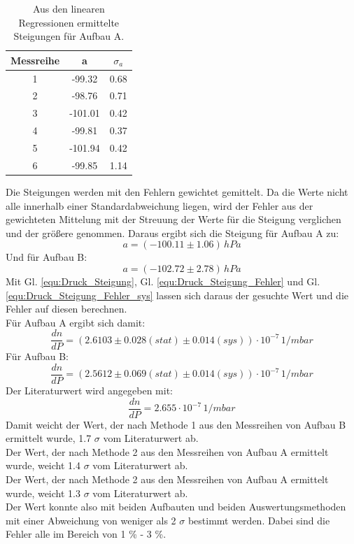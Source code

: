 \documentclass[12pt,a4paper]{article}
\begin{document}
\begin{table}
\begin{center}
\begin{tabular}{|c|c|c|}
\hline 
Messreihe & a & $\sigma _a$ \\ 
\hline 
1 & -99.32 & 0.68 \\ 
\hline 
2 & -98.76 & 0.71 \\ 
\hline 
3 & -101.01 & 0.42 \\ 
\hline 
4 & -99.81 & 0.37 \\ 
\hline 
5 & -101.94 & 0.42 \\ 
\hline 
6 & -99.85 & 1.14 \\  
\hline 
\end{tabular} 
\caption{Aus den linearen Regressionen ermittelte Steigungen für Aufbau A.}
\label{tab:Druck_Steigungen_A}
\end{center}
\end{table}

Die Steigungen werden mit den Fehlern gewichtet gemittelt. Da die Werte nicht alle innerhalb einer Standardabweichung liegen, wird der Fehler aus der gewichteten Mittelung mit der Streuung der Werte für die Steigung verglichen und der größere genommen. Daraus ergibt sich die Steigung für Aufbau A zu:
\begin{equation*}
a = (-100.11 \pm 1.06) \, \si{hPa}
\end{equation*}
Und für Aufbau B:
\begin{equation*}
a = (-102.72 \pm 2.78) \, \si{hPa}
\end{equation*}
Mit Gl. \ref{equ:Druck_Steigung}, Gl. \ref{equ:Druck_Steigung_Fehler} und Gl. \ref{equ:Druck_Steigung_Fehler_sys} lassen sich daraus der gesuchte Wert und die Fehler auf diesen berechnen. \\
Für Aufbau A ergibt sich damit:
\begin{equation*}
\dfrac{dn}{dP} = (2.6103 \pm 0.028 (stat) \pm 0.014 (sys)) \cdot 10^{-7} \, \si{1/mbar}  
\end{equation*}
Für Aufbau B:
\begin{equation*}
\dfrac{dn}{dP} = (2.5612 \pm 0.069 (stat) \pm 0.014 (sys)) \cdot 10^{-7} \, \si{1/mbar}
\end{equation*}
Der Literaturwert wird angegeben mit:
\begin{equation*}
\dfrac{dn}{dP} = 2.655 \cdot 10^{-7} \, \si{1/mbar}
\end{equation*}
Damit weicht der Wert, der nach Methode 1 aus den Messreihen von Aufbau B ermittelt wurde, 1.7 $\sigma$ vom Literaturwert ab.\\
Der Wert, der nach Methode 2 aus den Messreihen von Aufbau A ermittelt wurde, weicht 1.4 $\sigma$ vom Literaturwert ab.\\
Der Wert, der nach Methode 2 aus den Messreihen von Aufbau A ermittelt wurde, weicht 1.3 $\sigma$ vom Literaturwert ab.\\
Der Wert konnte also mit beiden Aufbauten und beiden Auswertungsmethoden mit einer Abweichung von weniger als 2 $\sigma$ bestimmt werden. Dabei sind die Fehler alle im Bereich von 1 \% - 3 \%.
\end{document}
